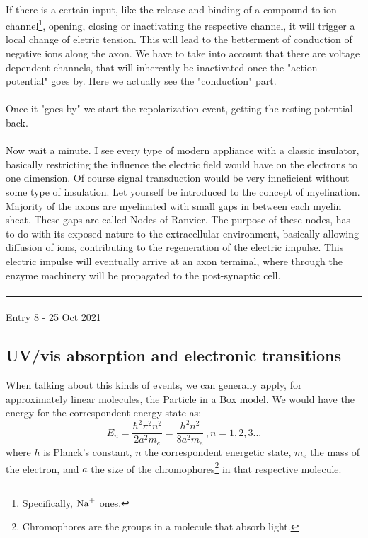 \documentclass[12pt,  letterpaper]{article}
\begin{document}
\paragraph*{}
If there is a certain input, like the release and binding of a compound to ion channel\footnote{Specifically, $\ce{Na+}$ ones.}, opening, closing or inactivating the respective channel, it will trigger a local change of eletric tension. This will lead to the betterment of conduction of negative ions along the axon. We have to take into account that there are voltage dependent channels, that will inherently be inactivated once the "action potential" goes by. Here we actually see the "conduction" part.\paragraph*{}
Once it "goes by" we start the repolarization event, getting  the resting potential back.\paragraph*{}
Now wait a minute. I see every type of modern appliance with a classic insulator, basically restricting the influence the electric field would have on the electrons to one dimension. Of course signal transduction would be very inneficient without some type of insulation. Let yourself be introduced to the concept of myelination. Majority of the axons are myelinated with small gaps in between each myelin sheat. These gaps are called Nodes of Ranvier. The purpose of these nodes, has to do with its exposed nature to the extracellular environment, basically allowing diffusion of ions, contributing to the regeneration of the electric impulse. This electric impulse will eventually arrive at	an axon terminal, where through the enzyme machinery will be propagated to the post-synaptic cell.\paragraph*{}
\hrule
\paragraph*{}
Entry 8 - 25 Oct 2021
\subsection*{UV/vis absorption and electronic transitions}
When talking about this kinds of events, we can generally apply, for approximately linear molecules, the Particle in a Box model. We would have the energy for the correspondent energy state as:
\begin{equation}
E_{n} = \frac{\hbar^{2}\pi^{2}n^{2}}{2a^{2}m_{e}} = \frac{h^{2}n^{2}}{8a^{2}m_{e}}\,, n = 1,2,3...
\end{equation}
where $h$ is Planck's constant, $n$ the correspondent energetic state, $m_{e}$ the mass of the electron, and $a$ the size of the chromophores\footnote{Chromophores are the groups in a molecule that absorb light.} in that respective molecule.
\end{document}
